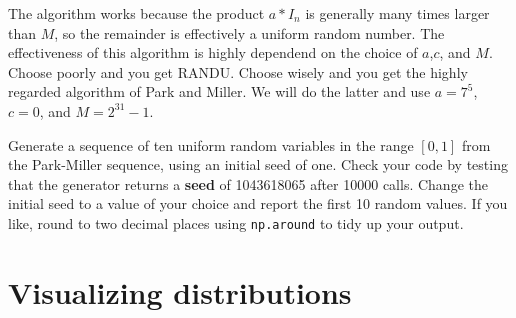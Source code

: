 The algorithm works because the product $a*I_{n}$ is generally many
times larger than $M$, so the remainder is effectively a uniform
random number.  The effectiveness of this algorithm is highly
dependend on the choice of $a$,$c$, and $M$.  Choose poorly and you get
RANDU.  Choose wisely and you get the highly regarded algorithm of
Park and Miller.  We will do the latter and use $a=7^5$, $c=0$, and $M
= 2^{31}-1$.

\begin{samepage}
\begin{plot} \end{plot}
Generate a sequence of ten uniform random variables in the range
$[0,1]$ from the Park-Miller sequence, using an initial seed of one.
Check your code by testing that the generator returns a {\bf seed} of
1043618065 after 10000 calls.  Change the initial seed to a value of
your choice and report the first 10 random values.  If you like, round
to two decimal places using {\tt np.around} to tidy up your output.
\end{samepage}

\section{Visualizing distributions}

